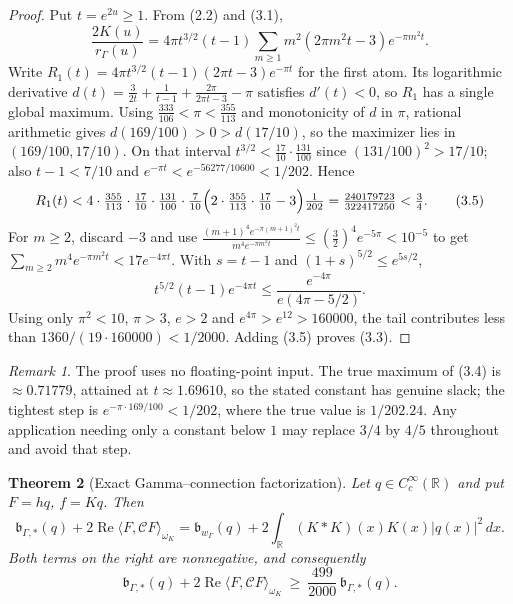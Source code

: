 \documentclass[11pt]{amsart}
\newtheorem{theorem}{Theorem}[section]
\theoremstyle{definition}
\theoremstyle{remark}
\newtheorem{remark}[theorem]{Remark}
\newcommand{\R}{\mathbb R}
\newcommand{\dd}{\,d}
\begin{document}
\begin{proof}
Put \(t=e^{2u}\ge1\).  From (2.2) and (3.1),
\[
 \frac{2K(u)}{r_\Gamma(u)}
 =4\pi t^{3/2}(t-1)\sum_{m\ge1}m^2(2\pi m^2t-3)e^{-\pi m^2t}.
\tag{3.4}
\]
Write \(R_1(t)=4\pi t^{3/2}(t-1)(2\pi t-3)e^{-\pi t}\) for the first
atom.  Its logarithmic derivative
\(d(t)=\frac3{2t}+\frac1{t-1}+\frac{2\pi}{2\pi t-3}-\pi\) satisfies
\(d'(t)<0\), so \(R_1\) has a single global maximum.  Using
\(\frac{333}{106}<\pi<\frac{355}{113}\) and monotonicity of \(d\) in
\(\pi\), rational arithmetic gives \(d(169/100)>0>d(17/10)\), so the
maximizer lies in \((169/100,17/10)\).  On that interval
\(t^{3/2}<\frac{17}{10}\cdot\frac{131}{100}\) since
\((131/100)^2>17/10\); also \(t-1<7/10\) and
\(e^{-\pi t}<e^{-56277/10600}<1/202\).  Hence
\[
 R_1(t)<4\cdot\tfrac{355}{113}\cdot\tfrac{17}{10}\cdot\tfrac{131}{100}
 \cdot\tfrac7{10}
 \Bigl(2\cdot\tfrac{355}{113}\cdot\tfrac{17}{10}-3\Bigr)\tfrac1{202}
 =\tfrac{240179723}{322417250}<\tfrac34 .
\tag{3.5}
\]
For \(m\ge2\), discard \(-3\) and use
\(\frac{(m+1)^4e^{-\pi(m+1)^2t}}{m^4e^{-\pi m^2t}}\le(\tfrac32)^4e^{-5\pi}<10^{-5}\)
to get \(\sum_{m\ge2}m^4e^{-\pi m^2t}<17e^{-4\pi t}\).  With \(s=t-1\) and
\((1+s)^{5/2}\le e^{5s/2}\),
\[
 t^{5/2}(t-1)e^{-4\pi t}\le\frac{e^{-4\pi}}{e(4\pi-5/2)} .
\tag{3.6}
\]
Using only \(\pi^2<10\), \(\pi>3\), \(e>2\) and \(e^{4\pi}>e^{12}>160000\),
the tail contributes less than \(1360/(19\cdot160000)<1/2000\).  Adding
(3.5) proves (3.3).
\end{proof}

\begin{remark}
The proof uses no floating-point input.  The true maximum of (3.4) is
\(\approx0.71779\), attained at \(t\approx1.69610\), so the stated
constant has genuine slack; the tightest step is
\(e^{-\pi\cdot169/100}<1/202\), where the true value is \(1/202.24\).
Any application needing only a constant below \(1\) may replace \(3/4\)
by \(4/5\) throughout and avoid that step.
\end{remark}

\begin{theorem}[Exact Gamma--connection factorization]
\label{thm:absorption}
Let \(q\in C_c^\infty(\R)\) and put \(F=hq\), \(f=Kq\).  Then
\[
 \boxed{
 \mathfrak b_{\Gamma,*}(q)+2\operatorname{Re}\langle F,\mathcal CF\rangle_{\omega_K}
 =\mathfrak b_{w_\Gamma}(q)+2\int_\R(K*K)(x)K(x)|q(x)|^2\dd x .}
\tag{3.7}
\]
Both terms on the right are nonnegative, and consequently
\[
 \mathfrak b_{\Gamma,*}(q)+2\operatorname{Re}\langle F,\mathcal CF\rangle_{\omega_K}
 \ \ge\ \frac{499}{2000}\,\mathfrak b_{\Gamma,*}(q).
\tag{3.8}
\]
\end{theorem}
\end{document}
